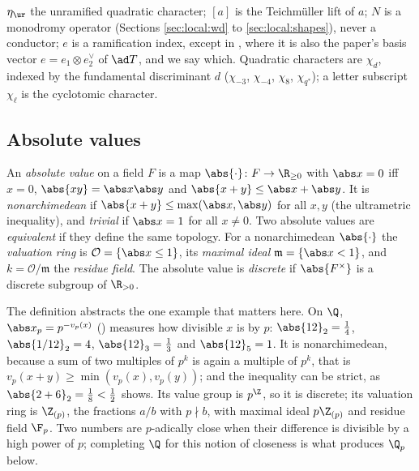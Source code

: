 \begin{convention}
\begin{enumerate}[label=(\alph*)]
$\eta_{\ur}$ the unramified quadratic character; $[a]$ is the Teichm\"uller lift of $a$; $N$ is a monodromy operator (Sections
\ref{sec:local:wd} to \ref{sec:local:shapes}), never a conductor; $e$ is a ramification index, except in ,
where it is also the paper's basis vector $e=e_1\otimes e_2^\vee$ of $\ad T$, and we say which. Quadratic characters are $\chi_d$, indexed
by the fundamental discriminant $d$ ($\chi_{-3}$, $\chi_{-4}$, $\chi_8$, $\chi_{q^*}$); a letter subscript $\chi_\ell$ is the
cyclotomic character.
\end{enumerate}
\end{convention}

\subsection{Absolute values}

\begin{definition}\label{def:local:absval}
An \emph{absolute value} on a field $F$ is a map $\abs{\cdot}\colon F\to\R_{\ge0}$ with $\abs x=0$ iff $x=0$, $\abs{xy}=\abs x\abs y$ and
$\abs{x+y}\le\abs x+\abs y$. It is \emph{nonarchimedean} if $\abs{x+y}\le\max(\abs x,\abs y)$ for all $x,y$ (the ultrametric
inequality), and \emph{trivial} if $\abs x=1$ for all $x\ne0$. Two absolute values are \emph{equivalent} if they define the same
topology. For a nonarchimedean $\abs{\cdot}$ the \emph{valuation ring} is $\mathcal O=\{\abs x\le1\}$, its \emph{maximal ideal}
$\mathfrak m=\{\abs x<1\}$, and $k=\mathcal O/\mathfrak m$ the \emph{residue field}. The absolute value is \emph{discrete} if
$\abs{F^\times}$ is a discrete subgroup of $\R_{>0}$.
\end{definition}

The definition abstracts the one example that matters here. On $\Q$, $\abs x_p=p^{-v_p(x)}$ () measures how divisible $x$ is
by $p$: $\abs{12}_2=\frac14$, $\abs{1/12}_2=4$, $\abs{12}_3=\frac13$ and $\abs{12}_5=1$. It is nonarchimedean, because a sum of two multiples of $p^k$ is
again a multiple of $p^k$, that is $v_p(x+y)\ge\min(v_p(x),v_p(y))$; and the inequality can be strict, as $\abs{2+6}_2=\frac18<\frac12$ shows. Its
value group is $p^{\Z}$, so it is discrete; its valuation ring is $\Z_{(p)}$, the fractions $a/b$ with $p\nmid b$, with maximal ideal $p\Z_{(p)}$
and residue field $\F_p$. Two numbers are $p$-adically close when their difference is divisible by a high power of $p$; completing $\Q$ for
this notion of closeness is what produces $\Q_p$ below.

